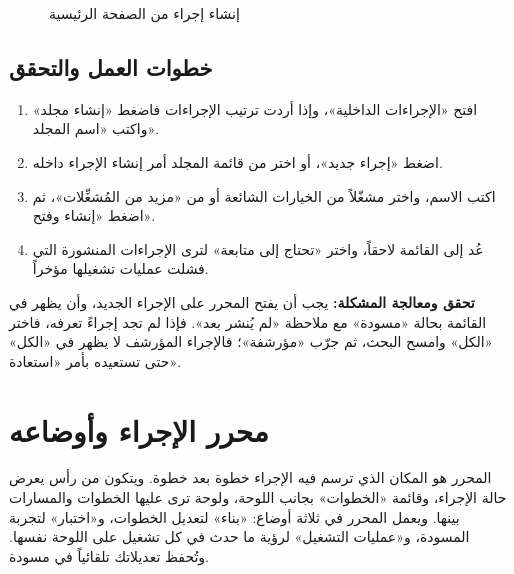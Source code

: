 \begin{figure}[H]
\centering
{}
\rclegend
\caption{إنشاء إجراء من الصفحة الرئيسية}
\label{fig:builder-internal-sops-flow}
\end{figure}

\subsection{خطوات العمل والتحقق}
\begin{enumerate}
\item افتح «الإجراءات الداخلية»، وإذا أردت ترتيب الإجراءات فاضغط «إنشاء مجلد» واكتب «اسم المجلد».
\item اضغط «إجراء جديد»، أو اختر من قائمة المجلد أمر إنشاء الإجراء داخله.
\item اكتب الاسم، واختر مشغّلاً من الخيارات الشائعة أو من «مزيد من المُشغِّلات»، ثم اضغط «إنشاء وفتح».
\item عُد إلى القائمة لاحقاً، واختر «تحتاج إلى متابعة» لترى الإجراءات المنشورة التي فشلت عمليات تشغيلها مؤخراً.
\end{enumerate}

\textbf{تحقق ومعالجة المشكلة:} يجب أن يفتح المحرر على الإجراء الجديد، وأن يظهر في القائمة بحالة «مسودة» مع ملاحظة «لم يُنشر بعد». فإذا لم تجد إجراءً تعرفه، فاختر «الكل» وامسح البحث، ثم جرّب «مؤرشفة»؛ فالإجراء المؤرشف لا يظهر في «الكل» حتى تستعيده بأمر «استعادة».

\clearpage
\section{محرر الإجراء وأوضاعه}
\label{sec:builder-feature-isop-editor}

المحرر هو المكان الذي ترسم فيه الإجراء خطوة بعد خطوة. ويتكون من رأس يعرض حالة الإجراء، وقائمة «الخطوات» بجانب اللوحة، ولوحة ترى عليها الخطوات والمسارات بينها. ويعمل المحرر في ثلاثة أوضاع: «بناء» لتعديل الخطوات، و«اختبار» لتجربة المسودة، و«عمليات التشغيل» لرؤية ما حدث في كل تشغيل على اللوحة نفسها. وتُحفظ تعديلاتك تلقائياً في مسودة.

